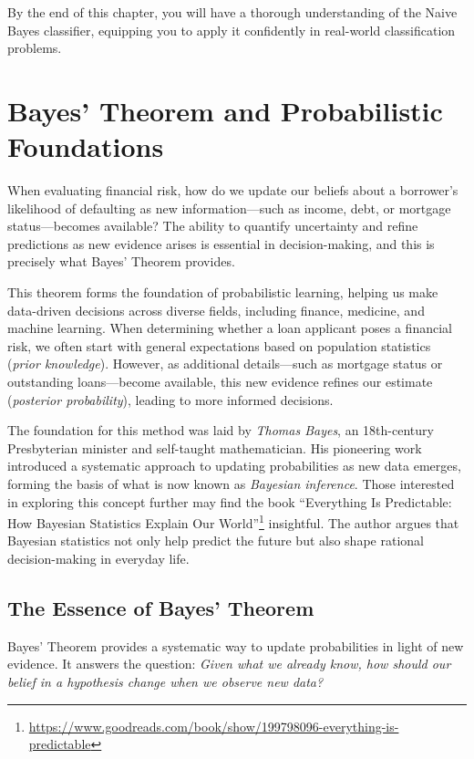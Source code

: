 \documentclass[
  11pt,
]{book}
\renewcommand{\href}[2]{#2\footnote{\url{#1}}}
\theoremstyle{definition}
\theoremstyle{definition}
\theoremstyle{definition}
\theoremstyle{definition}
\theoremstyle{remark}
\begin{document}
By the end of this chapter, you will have a thorough understanding of the Naive Bayes classifier, equipping you to apply it confidently in real-world classification problems.

\section{Bayes' Theorem and Probabilistic Foundations}\label{bayes-theorem-and-probabilistic-foundations}

When evaluating financial risk, how do we update our beliefs about a borrower's likelihood of defaulting as new information---such as income, debt, or mortgage status---becomes available? The ability to quantify uncertainty and refine predictions as new evidence arises is essential in decision-making, and this is precisely what Bayes' Theorem provides.

This theorem forms the foundation of probabilistic learning, helping us make data-driven decisions across diverse fields, including finance, medicine, and machine learning. When determining whether a loan applicant poses a financial risk, we often start with general expectations based on population statistics (\emph{prior knowledge}). However, as additional details---such as mortgage status or outstanding loans---become available, this new evidence refines our estimate (\emph{posterior probability}), leading to more informed decisions.

The foundation for this method was laid by \emph{Thomas Bayes}, an 18th-century Presbyterian minister and self-taught mathematician. His pioneering work introduced a systematic approach to updating probabilities as new data emerges, forming the basis of what is now known as \emph{Bayesian inference}. Those interested in exploring this concept further may find the book \href{https://www.goodreads.com/book/show/199798096-everything-is-predictable}{``Everything Is Predictable: How Bayesian Statistics Explain Our World''} insightful. The author argues that Bayesian statistics not only help predict the future but also shape rational decision-making in everyday life.

\subsection*{The Essence of Bayes' Theorem}\label{the-essence-of-bayes-theorem}


Bayes' Theorem provides a systematic way to update probabilities in light of new evidence. It answers the question: \emph{Given what we already know, how should our belief in a hypothesis change when we observe new data?}
\end{document}
